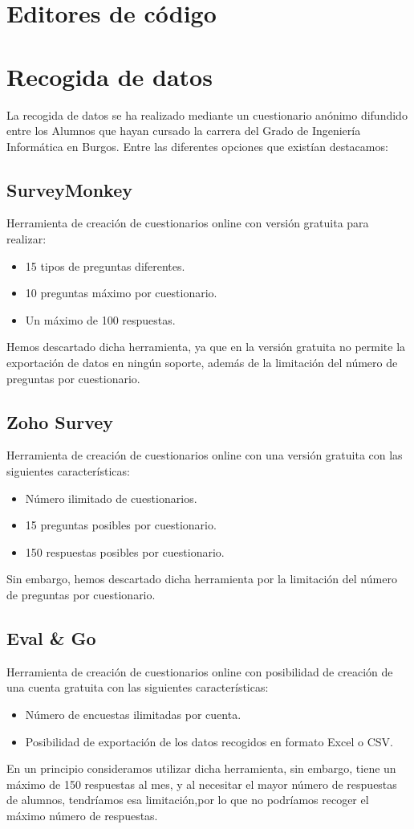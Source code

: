 \section{Editores de código}
\section{Recogida de datos}
La recogida de datos se ha realizado mediante un cuestionario anónimo difundido entre los Alumnos que hayan cursado la carrera del Grado de Ingeniería Informática en Burgos. Entre las diferentes opciones que existían destacamos: 
\subsection{SurveyMonkey}
Herramienta de creación de cuestionarios online con versión gratuita para realizar: 
\begin{itemize}
\item 15 tipos de preguntas diferentes. 
\item 10 preguntas máximo por cuestionario. 
\item Un máximo de 100 respuestas.  
\end{itemize}
Hemos descartado dicha herramienta, ya que en la versión gratuita no permite la exportación de datos en ningún soporte, además de la limitación del número de preguntas por cuestionario. 
\subsection{Zoho Survey}
Herramienta de creación de cuestionarios online con una versión gratuita con las siguientes características: 
\begin{itemize}
\item Número ilimitado de cuestionarios. 
\item 15 preguntas posibles por cuestionario. 
\item 150 respuestas posibles por cuestionario. 
\end{itemize}
Sin embargo, hemos descartado dicha herramienta por la limitación del número de preguntas por cuestionario. 
\subsection{Eval \& Go}
Herramienta de creación de cuestionarios online con posibilidad de creación de una cuenta gratuita con las siguientes características: 
\begin{itemize}
\item Número de encuestas ilimitadas por cuenta. 
\item Posibilidad de exportación de los  datos  recogidos en formato Excel o CSV. 
\end{itemize}
En un principio consideramos utilizar dicha herramienta, sin embargo, tiene un máximo de 150 respuestas al mes, y al necesitar el mayor número de respuestas de alumnos, tendríamos esa limitación,por lo que no podríamos recoger el máximo número de respuestas. \nocite{carl:encuestas}
